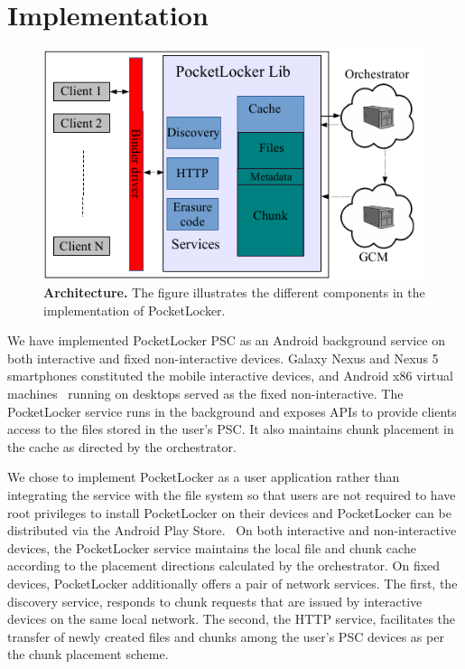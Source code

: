 
\section{Implementation}
\label{sec-implementation}

\begin{figure}[t]

\includegraphics[width=\columnwidth]{./figures/implementation.pdf}

\caption{\small \textbf{Architecture.} The figure illustrates the different
  components in the implementation of PocketLocker.}

\label{fig-implementation}

\end{figure}

We have implemented PocketLocker PSC as an Android background service on both
interactive and fixed non-interactive devices. Galaxy Nexus and Nexus 5
smartphones constituted the mobile interactive devices, and Android x86
virtual machines~\cite{androidx86} running on desktops served as the fixed
non-interactive. The PocketLocker service runs in the background and exposes
APIs to provide clients access to the files stored in the user's PSC. It also
maintains chunk placement in the cache as directed by the orchestrator. 

We chose to implement PocketLocker as a user application rather than
integrating the service with the file system so that users are not required
to have root privileges to install PocketLocker on their devices and
PocketLocker can be distributed via the Android Play Store.~\cite{playstore}
On both interactive and non-interactive devices, the PocketLocker service
maintains the local file and chunk cache according to the placement
directions calculated by the orchestrator. On fixed devices, PocketLocker
additionally offers a pair of network services. The first, the discovery
service, responds to chunk requests that are issued by interactive devices on
the same local network. The second, the HTTP service, facilitates the
transfer of newly created files and chunks among the user's PSC devices as
per the chunk placement scheme.

